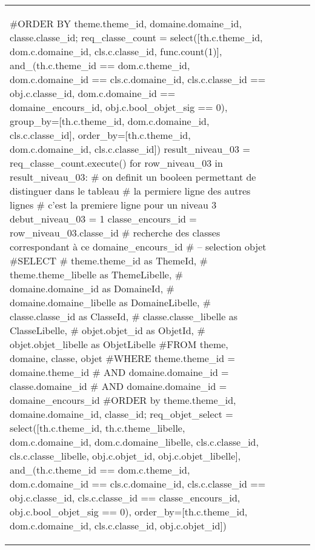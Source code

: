 \documentclass[12pt,titlepage,oneside]{book}
\begin{document}
\begin{supertabular}{|p{7.5cm}|p{7.5cm}|p{7.5cm}|c|p{10cm}|}
\begin{lbdpython}
      #ORDER BY theme.theme_id, domaine.domaine_id, classe.classe_id;
      req_classe_count = select([th.c.theme_id, dom.c.domaine_id,
                                 cls.c.classe_id, func.count(1)],
                         and_(th.c.theme_id == dom.c.theme_id,
                              dom.c.domaine_id == cls.c.domaine_id,
                              cls.c.classe_id == obj.c.classe_id,
                              dom.c.domaine_id == domaine_encours_id,
                              obj.c.bool_objet_sig == 0),
                         group_by=[th.c.theme_id, dom.c.domaine_id, cls.c.classe_id],
                         order_by=[th.c.theme_id, dom.c.domaine_id, cls.c.classe_id])
      result_niveau_03 = req_classe_count.execute()
      for row_niveau_03 in result_niveau_03:
         # on definit un booleen permettant de distinguer dans le tableau
         # la permiere ligne des autres lignes
         # c'est la premiere ligne pour un niveau 3
         debut_niveau_03 = 1
         classe_encours_id = row_niveau_03.classe_id
         # recherche des classes correspondant à ce domaine_encours_id
         # -- selection objet
         #SELECT
         #   theme.theme_id as ThemeId,
         #   theme.theme_libelle as ThemeLibelle,
         #   domaine.domaine_id as DomaineId,
         #   domaine.domaine_libelle as DomaineLibelle,
         #   classe.classe_id as ClasseId,
         #   classe.classe_libelle as ClasseLibelle,
         #   objet.objet_id as ObjetId,
         #   objet.objet_libelle as ObjetLibelle
         #FROM theme, domaine, classe, objet
         #WHERE theme.theme_id = domaine.theme_id
         #  AND domaine.domaine_id = classe.domaine_id
         #  AND domaine.domaine_id = domaine_encours_id
         #ORDER by theme.theme_id, domaine.domaine_id, classe_id;
         req_objet_select = select([th.c.theme_id, th.c.theme_libelle,
                                    dom.c.domaine_id, dom.c.domaine_libelle,
                                    cls.c.classe_id, cls.c.classe_libelle,
                                    obj.c.objet_id, obj.c.objet_libelle],
                              and_(th.c.theme_id == dom.c.theme_id,
                                   dom.c.domaine_id == cls.c.domaine_id,                              
                                   cls.c.classe_id == obj.c.classe_id,                              
                                   cls.c.classe_id == classe_encours_id,
                                   obj.c.bool_objet_sig == 0),
                              order_by=[th.c.theme_id, dom.c.domaine_id, cls.c.classe_id, obj.c.objet_id])

\end{lbdpython}
\end{supertabular}
\end{document}
